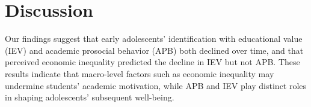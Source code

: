 \section{Discussion}
Our findings suggest that early adolescents’ identification with educational value (IEV) and academic prosocial behavior (APB) both declined over time, and that perceived economic inequality predicted the decline in IEV but not APB. These results indicate that macro-level factors such as economic inequality may undermine students’ academic motivation, while APB and IEV play distinct roles in shaping adolescents’ subsequent well-being.
